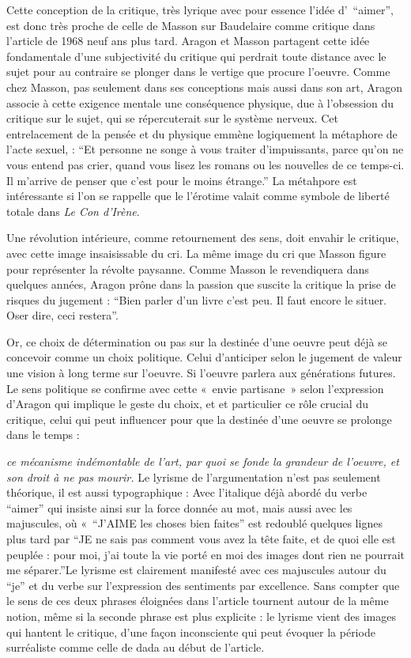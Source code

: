 	 Cette conception de la critique, très lyrique avec pour essence l’idée d’ \enquote{aimer},  est donc très proche de celle de Masson sur Baudelaire comme critique dans l’article de 1968 neuf ans plus tard. Aragon et Masson partagent cette idée fondamentale d’une subjectivité du critique qui perdrait toute distance avec le sujet pour au contraire se plonger dans le vertige que procure l’oeuvre. Comme chez Masson, pas seulement dans ses conceptions mais aussi dans son art, Aragon associe à cette exigence mentale une conséquence physique, due à l’obsession du critique sur le sujet, qui se répercuterait sur le système nerveux. Cet entrelacement de la pensée et du physique emmène logiquement la métaphore de l’acte sexuel, : \enquote{Et personne ne songe à vous traiter d’impuissants, parce qu’on ne vous entend pas crier, quand vous lisez les romans ou les nouvelles de ce temps-ci. Il m’arrive de penser que c’est pour le moins étrange.} La métahpore est intéressante si l'on se rappelle que le l'érotime valait comme symbole de liberté totale dans \emph{Le Con d'Irène}. 

     	Une révolution intérieure, comme retournement des sens, doit envahir le critique, avec cette image insaisissable du cri. La même image du cri que Masson figure pour représenter la révolte paysanne. Comme Masson le revendiquera dans quelques années, Aragon prône dans la passion que suscite la critique la prise de risques du jugement : \enquote{Bien parler d’un livre c’est peu. Il faut encore le situer. Oser dire, ceci restera}. 

 Or, ce choix de détermination ou pas sur la destinée d’une oeuvre peut déjà se concevoir comme un choix politique. Celui d’anticiper selon le jugement de valeur une vision à long terme sur l’oeuvre. Si l’oeuvre parlera aux générations futures. Le sens politique se confirme avec cette « envie partisane » selon l’expression d’Aragon qui implique le geste du choix, et et particulier ce rôle crucial du critique, celui qui peut influencer pour que la destinée d’une oeuvre se prolonge dans le temps : 

\emph{ce mécanisme indémontable de l’art, par quoi se fonde la grandeur de l’oeuvre, et son droit à ne pas mourir.} Le lyrisme de l’argumentation n’est pas seulement théorique, il est aussi typographique : Avec l’italique déjà abordé du verbe \enquote{aimer} qui insiste ainsi sur la force donnée au mot, mais aussi avec les majuscules, où « \enquote{J’AIME les choses bien faites} est redoublé quelques lignes plus tard par \enquote{JE ne sais pas comment vous avez la tête faite, et de quoi elle est peuplée : pour moi, j’ai toute la vie porté en moi des images dont rien ne pourrait me séparer.}Le lyrisme est clairement manifesté avec ces majuscules autour du \enquote{je} et du verbe sur l’expression des sentiments par excellence. Sans compter que le sens de ces deux phrases éloignées dans l’article tournent autour de la même notion, même si la seconde phrase est plus explicite : le lyrisme vient des images qui hantent le critique, d’une façon inconsciente qui peut évoquer la période surréaliste comme celle de dada au début de l’article. 

